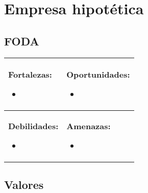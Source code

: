 \documentclass{article}
\begin{document}
\section{Empresa hipotética}




\subsection{FODA}
\begin{center}
    \begin{tabular}{ | p{8.5cm} | p{8.5cm} | }
         \hline
             \textbf{Fortalezas: } 
             \begin{itemize}
                 \item 
             \end{itemize}
             &
             \textbf{Oportunidades: } 
             \begin{itemize}
                 \item 
             \end{itemize}
             \\ 
         \hline
             \textbf{Debilidades: } 
             \begin{itemize}
                 \item 
             \end{itemize}
             &
             \textbf{Amenazas: } 
             \begin{itemize}
                 \item 
             \end{itemize}
             \\ 
         \hline
    \end{tabular}
 \end{center}


\subsection{Valores}
\end{document}
